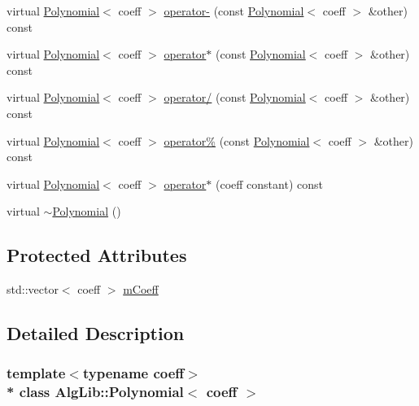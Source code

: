\begin{DoxyCompactItemize}
\item 
virtual \hyperlink{class_alg_lib_1_1_polynomial}{Polynomial}$<$ coeff $>$ \hyperlink{class_alg_lib_1_1_polynomial_aa6ed3795fcb099987ff7fb8747203b43}{operator-\/} (const \hyperlink{class_alg_lib_1_1_polynomial}{Polynomial}$<$ coeff $>$ \&other) const 
\item 
virtual \hyperlink{class_alg_lib_1_1_polynomial}{Polynomial}$<$ coeff $>$ \hyperlink{class_alg_lib_1_1_polynomial_a68b9b745dabf414a81fb8d35e6f233ba}{operator$\ast$} (const \hyperlink{class_alg_lib_1_1_polynomial}{Polynomial}$<$ coeff $>$ \&other) const 
\item 
virtual \hyperlink{class_alg_lib_1_1_polynomial}{Polynomial}$<$ coeff $>$ \hyperlink{class_alg_lib_1_1_polynomial_a507bf9649c02111574112ddb0baf0973}{operator/} (const \hyperlink{class_alg_lib_1_1_polynomial}{Polynomial}$<$ coeff $>$ \&other) const 
\item 
virtual \hyperlink{class_alg_lib_1_1_polynomial}{Polynomial}$<$ coeff $>$ \hyperlink{class_alg_lib_1_1_polynomial_a8e63ddfc3bd81bc300781f526bbd70d6}{operator\%} (const \hyperlink{class_alg_lib_1_1_polynomial}{Polynomial}$<$ coeff $>$ \&other) const 
\item 
virtual \hyperlink{class_alg_lib_1_1_polynomial}{Polynomial}$<$ coeff $>$ \hyperlink{class_alg_lib_1_1_polynomial_ad69fdd8f1a1bd9999fd19b337c429d3f}{operator$\ast$} (coeff constant) const 
\item 
virtual \hyperlink{class_alg_lib_1_1_polynomial_ad9c5777af178f70a1ef83abfdf1b2397}{$\sim$\+Polynomial} ()
\end{DoxyCompactItemize}
\subsection*{Protected Attributes}
\begin{DoxyCompactItemize}
\item 
std\+::vector$<$ coeff $>$ \hyperlink{class_alg_lib_1_1_polynomial_a1df73412faaadb6cbac4b7fad0135079}{m\+Coeff}
\end{DoxyCompactItemize}


\subsection{Detailed Description}
\subsubsection*{template$<$typename coeff$>$\\*
class Alg\+Lib\+::\+Polynomial$<$ coeff $>$}



